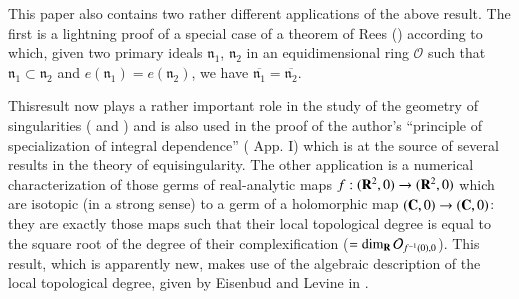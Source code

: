 This paper also contains two rather different applications of the above result. The first is a lightning proof of a special case of a theorem of Rees (\cite{art06-keyRe}) according to which, given two primary ideals $\mathfrak{n}_1$, $\mathfrak{n}_2$ in an equidimensional ring $\mathcal{O}$ such that $\mathfrak{n}_1 \subset \mathfrak{n}_2$ and $e(\mathfrak{n}_1) = e(\mathfrak{n}_2)$, we have $\overline{\mathfrak{n}_1} = \overline{\mathfrak{n}_2}$.

This\pageoriginale result now plays a rather important role in the study of the geometry of singularities (\cf \cite{art06-keyC.E.W.} and \cite{art06-keyH.L.}) and is also used in the proof of the author's ``principle of specialization of integral dependence'' (\cf \cite{art06-keyD.C.N.} App. I) which is at the source of several results in the theory of equisingularity. The other application is a numerical characterization of those germs of real-analytic maps  $f: (\mathbf{R}^2, 0) \to (\mathbf{R}^2, 0)$ which are isotopic (in a strong sense) to a germ of a holomorphic map $(\mathbf{C}, 0) \to (\mathbf{C}, 0)$: they are exactly those maps such that their local topological degree is equal to the square root of the degree of their complexification ($= \dim_{\mathbf{R}} \mathcal{O}_{f^{-1}(0),0} $). This result, which is apparently new, makes use of the algebraic description of the local topological degree, given by Eisenbud and Levine in \cite{art06-keyE.L.}.

\begin{remarks*}
\end{remarks*}

